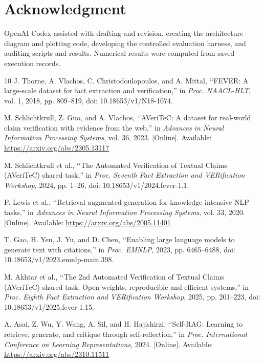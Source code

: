 \documentclass[conference]{IEEEtran}
\begin{document}
\section*{Acknowledgment}
OpenAI Codex assisted with drafting and revision, creating the architecture diagram and plotting code, developing the controlled evaluation harness, and auditing scripts and results. Numerical results were computed from saved execution records.

\begin{thebibliography}{10}
J. Thorne, A. Vlachos, C. Christodoulopoulos, and A. Mittal, \lq\lq FEVER: A large-scale dataset for fact extraction and verification,'' in \emph{Proc. NAACL-HLT}, vol. 1, 2018, pp. 809--819, doi: 10.18653/v1/N18-1074.

M. Schlichtkrull, Z. Guo, and A. Vlachos, \lq\lq AVeriTeC: A dataset for real-world claim verification with evidence from the web,'' in \emph{Advances in Neural Information Processing Systems}, vol. 36, 2023. [Online]. Available: \url{https://arxiv.org/abs/2305.13117}

M. Schlichtkrull et al., \lq\lq The Automated Verification of Textual Claims (AVeriTeC) shared task,'' in \emph{Proc. Seventh Fact Extraction and VERification Workshop}, 2024, pp. 1--26, doi: 10.18653/v1/2024.fever-1.1.

P. Lewis et al., \lq\lq Retrieval-augmented generation for knowledge-intensive NLP tasks,'' in \emph{Advances in Neural Information Processing Systems}, vol. 33, 2020. [Online]. Available: \url{https://arxiv.org/abs/2005.11401}

T. Gao, H. Yen, J. Yu, and D. Chen, \lq\lq Enabling large language models to generate text with citations,'' in \emph{Proc. EMNLP}, 2023, pp. 6465--6488, doi: 10.18653/v1/2023.emnlp-main.398.

M. Akhtar et al., \lq\lq The 2nd Automated Verification of Textual Claims (AVeriTeC) shared task: Open-weights, reproducible and efficient systems,'' in \emph{Proc. Eighth Fact Extraction and VERification Workshop}, 2025, pp. 201--223, doi: 10.18653/v1/2025.fever-1.15.

A. Asai, Z. Wu, Y. Wang, A. Sil, and H. Hajishirzi, \lq\lq Self-RAG: Learning to retrieve, generate, and critique through self-reflection,'' in \emph{Proc. International Conference on Learning Representations}, 2024. [Online]. Available: \url{https://arxiv.org/abs/2310.11511}


\end{thebibliography}
\end{document}
